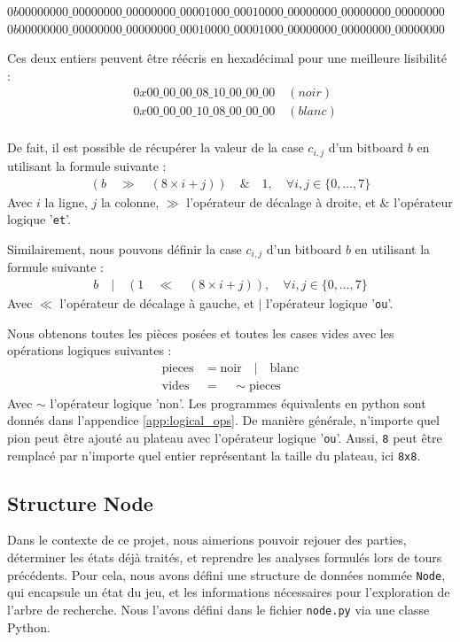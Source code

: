 \begin{center}
$0b00000000\_00000000\_00000000\_00001000\_00010000\_00000000\_00000000\_00000000$ \\
$0b00000000\_00000000\_00000000\_00010000\_00001000\_00000000\_00000000\_00000000$ \\
\end{center}
Ces deux entiers peuvent être réécris en hexadécimal pour une meilleure lisibilité :
\begin{align*}
    &0x00\_00\_00\_08\_10\_00\_00\_00 \quad (noir)\\
    &0x00\_00\_00\_10\_08\_00\_00\_00 \quad (blanc)\\
\end{align*}

De fait, il est possible de récupérer la valeur de la case $c_{i,j}$ d'un bitboard $b$ en utilisant la formule suivante : 
\begin{align*}
    (b\quad \gg\quad (8\times i+j))\quad \&\quad 1, \quad \forall i,j \in \{0,\dots,7\}
\end{align*}
Avec $i$ la ligne, $j$ la colonne, $\gg$ l'opérateur de décalage à droite, et $\&$ l'opérateur logique '\texttt{et}'.

Similairement, nous pouvons définir la case $c_{i,j}$ d'un bitboard $b$ en utilisant la formule suivante :
\begin{align*}
    b\quad |\quad (1\quad \ll\quad (8\times i+j)), \quad \forall i,j \in \{0,\dots,7\}
\end{align*}
Avec $\ll$ l'opérateur de décalage à gauche, et $|$ l'opérateur logique '\texttt{ou}'.

Nous obtenons toutes les pièces posées et toutes les cases vides avec les opérations logiques suivantes :
\begin{align*}
    \text{pieces} &= \text{noir} \quad | \quad \text{blanc} \\
    \text{vides} &= \quad\sim\text{pieces}
\end{align*}
Avec $\sim$ l'opérateur logique 'non'. Les programmes équivalents en python sont donnés dans l'appendice \ref{app:logical_ops}. De manière générale, n'importe quel pion peut être ajouté au plateau avec l'opérateur logique '\texttt{ou}'. Aussi, \texttt{8} peut être remplacé par n'importe quel entier représentant la taille du plateau, ici \texttt{8x8}.

\subsection{Structure Node}
\label{subsec:node}
Dans le contexte de ce projet, nous aimerions pouvoir rejouer des parties, déterminer les états déjà traités, et reprendre les analyses formulés lors de tours précédents. Pour cela, nous avons défini une structure de données nommée \texttt{Node}, qui encapsule un état du jeu, et les informations nécessaires pour l'exploration de l'arbre de recherche. Nous l'avons défini dans le fichier \texttt{node.py} via une classe Python. \vskip 0.5cm

